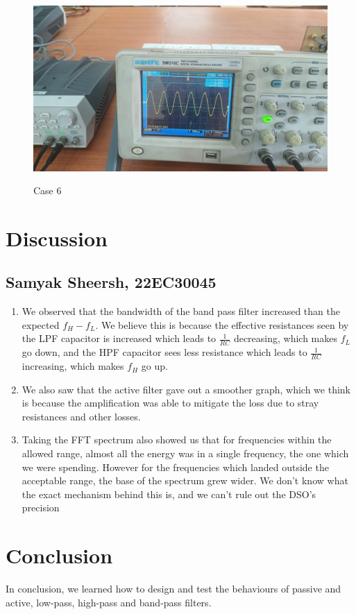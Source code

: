 \documentclass{article}
\begin{document}
\begin{figure}[!ht]
  \caption{Case 6}
  \includegraphics[width=\textwidth]{36.jpeg}
  \label{fig:36}
\end{figure}
\newpage

\vspace{5cm}

\section{Discussion}
\subsection{Samyak Sheersh, 22EC30045}
\begin{enumerate}
  \item We observed that the bandwidth of the band pass filter increased than the expected $f_H-f_L$. We believe this is because the effective resistances seen by the LPF capacitor is increased which leads to $\frac{1}{RC}$ decreasing, which makes $f_L$ go down, and the HPF capacitor sees less resistance which leads to $\frac{1}{RC}$ increasing, which makes $f_H$ go up.
  
  \item We also saw that the active filter gave out a smoother graph, which we think is because the amplification was able to mitigate the loss due to stray resistances and other losses.

  \item Taking the FFT spectrum also showed us that for frequencies within the allowed range, almost all the energy was in a single frequency, the one which we were spending. However for the frequencies which landed outside the acceptable range, the base of the spectrum grew wider. We don't know what the exact mechanism behind this is, and we can't rule out the DSO's precision
\end{enumerate}

\section{Conclusion}
In conclusion, we learned how to design and test the behaviours of passive and active, low-pass, high-pass and band-pass filters.
\end{document}
